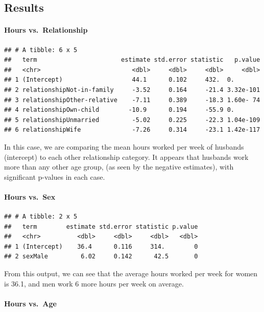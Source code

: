 \documentclass[]{article}
\let\oldparagraph\paragraph
\renewcommand{\paragraph}[1]{\oldparagraph{#1}\mbox{}}
\begin{document}
\hypertarget{results}{%
\subsection{Results}\label{results}}

\hypertarget{hours-vs.relationship}{%
\paragraph{Hours vs.~Relationship}\label{hours-vs.relationship}}

\begin{verbatim}
## # A tibble: 6 x 5
##   term                       estimate std.error statistic   p.value
##   <chr>                         <dbl>     <dbl>     <dbl>     <dbl>
## 1 (Intercept)                   44.1      0.102     432.  0.       
## 2 relationshipNot-in-family     -3.52     0.164     -21.4 3.32e-101
## 3 relationshipOther-relative    -7.11     0.389     -18.3 1.60e- 74
## 4 relationshipOwn-child        -10.9      0.194     -55.9 0.       
## 5 relationshipUnmarried         -5.02     0.225     -22.3 1.04e-109
## 6 relationshipWife              -7.26     0.314     -23.1 1.42e-117
\end{verbatim}

In this case, we are comparing the mean hours worked per week of
husbands (intercept) to each other relationship category. It appears
that husbands work more than any other age group, (as seen by the
negative estimates), with significant p-values in each case.

\hypertarget{hours-vs.sex}{%
\paragraph{Hours vs.~Sex}\label{hours-vs.sex}}

\begin{verbatim}
## # A tibble: 2 x 5
##   term        estimate std.error statistic p.value
##   <chr>          <dbl>     <dbl>     <dbl>   <dbl>
## 1 (Intercept)    36.4      0.116     314.        0
## 2 sexMale         6.02     0.142      42.5       0
\end{verbatim}

From this output, we can see that the average hours worked per week for
women is 36.1, and men work 6 more hours per week on average.

\hypertarget{hours-vs.age}{%
\paragraph{Hours vs.~Age}\label{hours-vs.age}}
\end{document}
